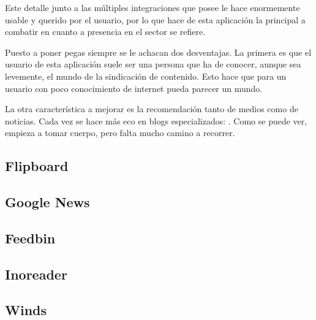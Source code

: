 Este detalle junto a las múltiples integraciones que posee le hace enormemente usable y querido por el usuario, por lo que hace de esta aplicación la principal a combatir en cuanto a presencia en el sector se refiere.

Puesto a poner pegas siempre se le achacan dos desventajas. La primera es que el usuario de esta aplicación suele ser una persona que ha de conocer, aunque sea levemente, el mundo de la sindicación de contenido. Esto hace que para un usuario con poco conocimiento de internet pueda parecer un mundo.

La otra característica a mejorar es la recomendación tanto de medios como de noticias. Cada vez se hace más eco en blogs especializados: . Como se puede ver, empieza a tomar cuerpo, pero falta mucho camino a recorrer.

\subsection{Flipboard}

\subsection{Google News}

\subsection{Feedbin}

\subsection{Inoreader}

\subsection{Winds}